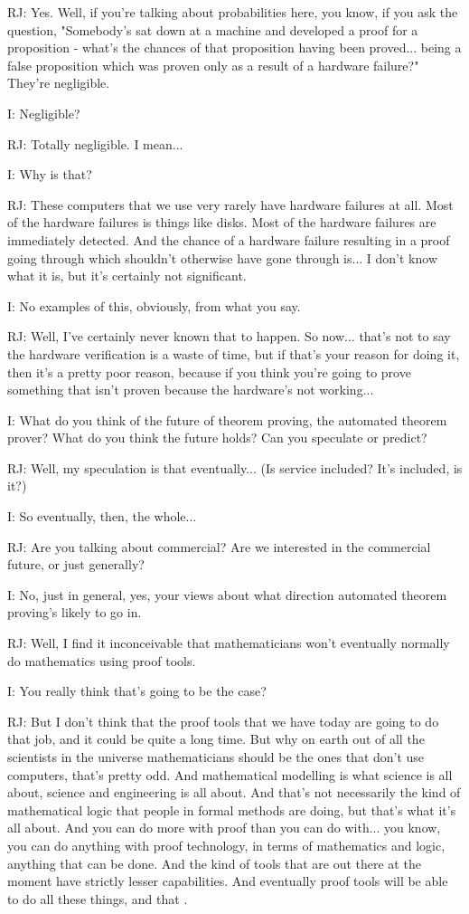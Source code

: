 \documentclass[10pt,titlepage]{book}
\begin{document}
RJ: Yes. Well, if you're talking about probabilities here, you know, if you ask the question, "Somebody's sat down at a machine and developed a proof for a proposition - what's the chances of that proposition having been proved... being a false proposition which was proven only as a result of a hardware failure?" They're negligible.

I: Negligible?

RJ: Totally negligible. I mean...

I: Why is that?

RJ: These computers that we use very rarely have hardware failures at all. Most of the hardware failures is things like disks. Most of the hardware failures are immediately detected. And the chance of a hardware failure resulting in a proof going through which shouldn't otherwise have gone through is...  I don't know what it is, but it's certainly not significant.

I: No examples of this, obviously, from what you say.

RJ: Well, I've certainly never known that to happen. So now... that's not to say the hardware verification is a waste of time, but if that's your reason for doing it, then it's a pretty poor reason, because if you think you're going to prove something that isn't proven because the hardware's not working...

I: What do you think of the future of theorem proving, the automated theorem prover? What do you think the future holds? Can you speculate or predict?

RJ: Well, my speculation is that eventually... (Is service included? It's included, is it?)

I: So eventually, then, the whole...

RJ: Are you talking about commercial? Are we interested in the commercial future, or just generally?

I: No, just in general, yes, your views about what direction automated theorem proving's likely to go in.

RJ: Well, I find it inconceivable that mathematicians won't eventually normally do mathematics using proof tools.

I: You really think that's going to be the case?

RJ: But I don't think that the proof tools that we have today are going to do that job, and it could be quite a long time. But why on earth out of all the scientists in the universe mathematicians should be the ones that don't use computers, that's pretty odd. And mathematical modelling is what science is all about, science and engineering is all about. And that's not necessarily the kind of mathematical logic that people in formal methods are doing, but that's what it's all about. And you can do more with proof than you can do with... you know, you can do anything with proof technology, in terms of mathematics and logic, anything that can be done. And the kind of tools that are out there at the moment have strictly lesser capabilities. And eventually proof tools will be able to do all these things, and that 	.
\end{document}

